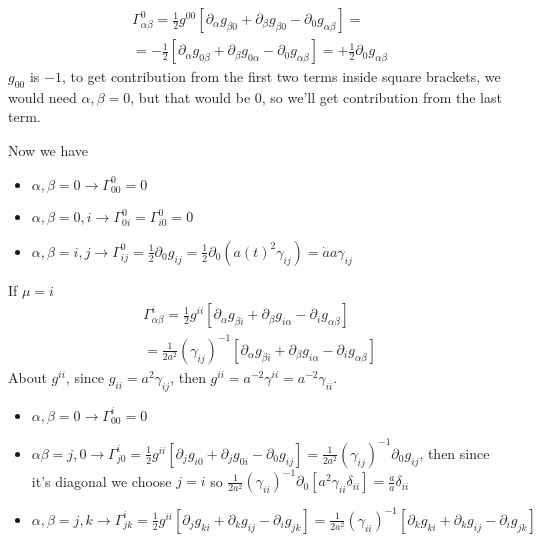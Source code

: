 \begin{gather*}
\Gamma ^{0}_{\alpha \beta } = \frac{1}{2} g^{00} \left[ \partial_{\alpha }g_{\beta 0} + \partial_{\beta} g_{\beta 0} - \partial_{0}g_{\alpha \beta } \right] =  \\
= -\frac{1}{2} \left[ \partial_{\alpha }g_{0\beta }+ \partial_{\beta }g_{0\alpha } -\partial_{0}g_{\alpha \beta } \right] = + \frac{1}{2} \partial_{0}g_{\alpha \beta }
\end{gather*}
$g_{00}$ is $-1$, to get contribution from the first two terms inside square brackets, we would need $\alpha , \beta =0$, but that would be $0$, so we'll get contribution from the last term.\par
Now we have
\begin{itemize}
\item $\alpha ,\beta  = 0 \to  \Gamma ^{0}_{00} = 0$
\item $\alpha ,\beta  = 0,i \to  \Gamma ^{0}_{0i} = \Gamma ^{0}_{i0} = 0$
\item $\alpha ,\beta = i,j \to  \Gamma ^{0}_{ij} = \frac{1}{2}\partial_{0}g_{ij} = \frac{1}{2} \partial_{0}\left( a\left( t \right)^{2}\gamma_{ij} \right) = \dot{a}a\gamma _{ij}$
\end{itemize}
If $\mu  = i$
\begin{gather*}
\Gamma ^{i}_{\alpha \beta } = \frac{1}{2}g^{ii }\left[ \partial_{\alpha }g_{\beta i} + \partial_{\beta }g_{i \alpha } - \partial_{i}g_{\alpha \beta } \right] \\
= \frac{1}{2 a^{2}} \left( \gamma _{ij} \right)^{-1}\left[ \partial_{\alpha }g_{\beta i} + \partial_{\beta }g_{i \alpha } - \partial_{i}g_{\alpha \beta } \right]
\end{gather*}
About $g^{ii}$, since $g_{ii} = a^{2}\gamma _{ij}$, then $g^{ii} = a^{-2} \gamma ^{ii} = a^{-2}\gamma _{ii}$.
\begin{itemize}
\item $\alpha, \beta =0 \to  \Gamma ^{i}_{00} = 0$
\item $\alpha \beta  = j,0 \to  \Gamma ^{i}_{j0} = \frac{1}{2} g^{ii}\left[ \partial_{j}g_{i0} + \partial_{j}g_{0i} - \partial_{0}g_{ij} \right] = \frac{1}{2 a^{2}}\left( \gamma _{ij} \right)^{-1}\partial_{0}g_{ij} $, then since it's diagonal we choose $j = i$ so $\frac{1}{2a^{2}}\left( \gamma _{ii} \right)^{-1}\partial_{0}\left[ a^{2}\gamma _{ii}\delta _{ii} \right] = \frac{\dot{a}}{a} \delta _{ii}$
\item $\alpha , \beta  = j,k \to \Gamma _{jk}^{i} = \frac{1}{2}g^{ii}\left[ \partial_{j}g_{ki} + \partial_{k}g_{ij} - \partial_{i}g_{jk} \right] = \frac{1}{2a^{2}}\left( \gamma _{ii} \right)^{-1} \left[\partial_{k}g_{ki} +\partial_{k}g_{ij} - \partial_{i}g_{jk}  \right] $
\end{itemize}
